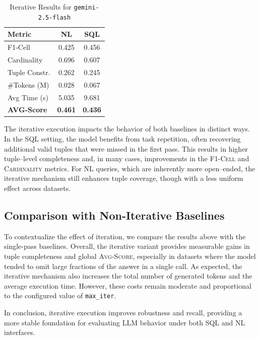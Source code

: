 \begin{table}[H]
    \centering
    \begin{tabular}{lcc}
        \toprule
        \textbf{Metric} & \textbf{NL} & \textbf{SQL} \\
        \midrule
        F1-Cell & 0.425 & 0.456 \\
        Cardinality & 0.696 & 0.607 \\
        Tuple Constr. & 0.262 & 0.245 \\
        \#Tokens (M) & 0.028 & 0.067 \\
        Avg Time (s) & 5.035 & 9.681 \\
        \textbf{AVG-Score} & \textbf{0.461} & \textbf{0.436} \\
        \bottomrule
    \end{tabular}
    \caption{Iterative Results for \texttt{gemini-2.5-flash}}
    \label{tab:iter_gemini}
\end{table}

The iterative execution impacts the behavior of both baselines in distinct ways. In the SQL setting, the model benefits from task repetition, often recovering additional valid tuples that were missed in the first pass. This results in higher tuple–level completeness and, in many cases, improvements in the \textsc{F1-Cell} and \textsc{Cardinality} metrics. For NL queries, which are inherently more open–ended, the iterative mechanism still enhances tuple coverage, though with a less uniform effect across datasets.

\subsection{Comparison with Non-Iterative Baselines}

To contextualize the effect of iteration, we compare the results above with the single-pass baselines. Overall, the iterative variant provides measurable gains in tuple completeness and global \textsc{Avg-Score}, especially in datasets where the model tended to omit large fractions of the answer in a single call. As expected, the iterative mechanism also increases the total number of generated tokens and the average execution time. However, these costs remain moderate and proportional to the configured value of \texttt{max\_iter}.

In conclusion, iterative execution improves robustness and recall, providing a more stable foundation for evaluating LLM behavior under both SQL and NL interfaces.

